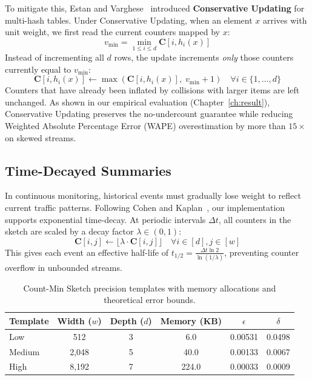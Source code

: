 To mitigate this, Estan and Varghese~\cite{estan2002new} introduced \textbf{Conservative Updating} for multi-hash tables. Under Conservative Updating, when an element $x$ arrives with unit weight, we first read the current counters mapped by $x$:
\begin{equation}
    v_{\min} = \min_{1 \le i \le d} \mathbf{C}[i, h_i(x)]
\end{equation}
Instead of incrementing all $d$ rows, the update increments \textit{only} those counters currently equal to $v_{\min}$:
\begin{equation}
    \mathbf{C}[i, h_i(x)] \leftarrow \max\left( \mathbf{C}[i, h_i(x)],\; v_{\min} + 1 \right) \quad \forall i \in \{1, \dots, d\}
\end{equation}
Counters that have already been inflated by collisions with larger items are left unchanged. As shown in our empirical evaluation (Chapter~\ref{ch:result}), Conservative Updating preserves the no-undercount guarantee while reducing Weighted Absolute Percentage Error (WAPE) overestimation by more than $15\times$ on skewed streams.

\subsection{Time-Decayed Summaries}
In continuous monitoring, historical events must gradually lose weight to reflect current traffic patterns. Following Cohen and Kaplan~\cite{cohen2007summarizing}, our implementation supports exponential time-decay. At periodic intervals $\Delta t$, all counters in the sketch are scaled by a decay factor $\lambda \in (0, 1)$:
\begin{equation}
    \mathbf{C}[i, j] \leftarrow \lfloor \lambda \cdot \mathbf{C}[i, j] \rfloor \quad \forall i \in [d], j \in [w]
\end{equation}
This gives each event an effective half-life of $t_{1/2} = \frac{\Delta t \ln 2}{\ln(1/\lambda)}$, preventing counter overflow in unbounded streams.

\begin{table}[htbp]
\centering
\begin{tabular}{l c c c c c}
\toprule
\textbf{Template} & \textbf{Width ($w$)} & \textbf{Depth ($d$)} & \textbf{Memory (KB)} & $\epsilon$ & $\delta$ \\
\midrule
Low    & 512   & 3 & 6.0   & 0.00531 & 0.0498 \\
Medium & 2,048 & 5 & 40.0  & 0.00133 & 0.0067 \\
High   & 8,192 & 7 & 224.0 & 0.00033 & 0.0009 \\
\bottomrule
\end{tabular}
\caption{Count-Min Sketch precision templates with memory allocations and theoretical error bounds.}
\label{tab:cms_templates_ch2}
\end{table}

